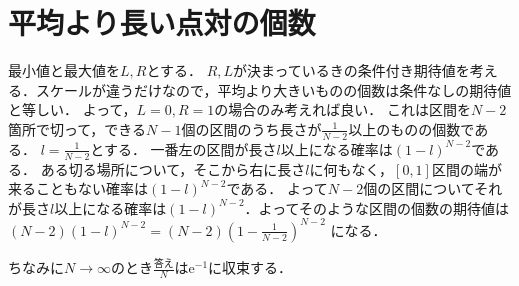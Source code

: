 \section{平均より長い点対の個数}
最小値と最大値を$L,R$とする．
$R,L$が決まっているきの条件付き期待値を考える．スケールが違うだけなので，平均より大きいものの個数は条件なしの期待値と等しい．
よって，$L=0,R=1$の場合のみ考えれば良い．
これは区間を$N-2$箇所で切って，できる$N-1$個の区間のうち長さが$\frac{1}{N-2}$以上のものの個数である．
$l = \frac{1}{N-2}$とする．
一番左の区間が長さ$l$以上になる確率は$(1-l)^{N-2}$である．
ある切る場所について，そこから右に長さ$l$に何もなく，$[0,1]$区間の端が来ることもない確率は$(1-l)^{N-2}$である．
よって$N-2$個の区間についてそれが長さ$l$以上になる確率は$(1-l)^{N-2}$．よってそのような区間の個数の期待値は
$(N-2)(1-l)^{N-2} = (N-2)(1-\frac{1}{N-2})^{N-2}$
になる．

ちなみに$N \to \infty$のとき$\frac{\mathrm{答え}}{N}$は$\mathrm{e}^{-1}$に収束する．
